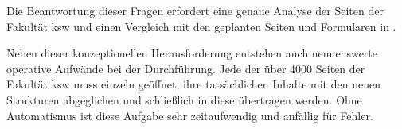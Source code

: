         Die Beantwortung dieser Fragen erfordert eine genaue Analyse der Seiten der Fakultät \gls{ksw}
        und einen Vergleich mit den geplanten Seiten und Formularen in \imperia.
        
        Neben dieser konzeptionellen Herausforderung entstehen auch nennenswerte operative Aufwände bei der Durchführung.
        Jede der über 4000 Seiten der Fakultät \gls{ksw} muss einzeln geöffnet,
        ihre tatsächlichen Inhalte mit den neuen Strukturen abgeglichen
        und schließlich in diese übertragen werden.
        Ohne Automatismus ist diese Aufgabe sehr zeitaufwendig und anfällig für Fehler.